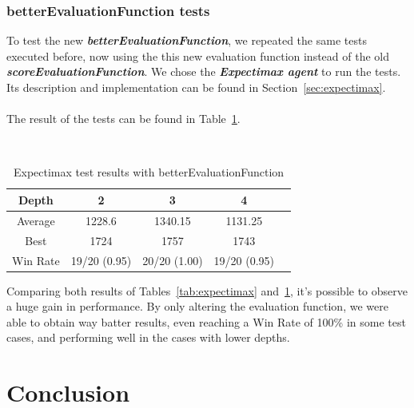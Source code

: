 \documentclass{article}
\begin{document}
\subsubsection{betterEvaluationFunction tests}

To test the new \textit\textbf{{betterEvaluationFunction}}, we repeated the same tests executed before, now using the this new evaluation function instead of the old \textit\textbf{{scoreEvaluationFunction}}. We chose the  \textit\textbf{{Expectimax agent}} to run the tests. Its description and implementation can be found in Section~\ref{sec:expectimax}.
~\\
~\\
The result of the tests can be found in Table~\ref{tab:expectimax-better}.

~\\
\begin{table}[!ht]
  \begin{center}
    \begin{tabular}{||c||c|c|c|c||}
      \hline
      Depth & 2 & 3 & 4 \\
      \hline\hline
      Average &  1228.6 &  1340.15 &  1131.25 \\
      \hline\hline
      Best & 1724 & 1757 & 1743 \\
      \hline\hline
      Win Rate & 19/20 (0.95) & 20/20 (1.00) & 19/20 (0.95) \\
      \hline
    \end{tabular}
    \caption{Expectimax test results with betterEvaluationFunction}
    \label{tab:expectimax-better}
  \end{center}
\end{table}

Comparing both results of Tables~\ref{tab:expectimax} and~\ref{tab:expectimax-better}, it's possible to observe a huge gain in performance. By only altering the evaluation function, we were able to obtain way batter results, even reaching a Win Rate of 100\% in some test cases, and performing well in the cases with lower depths.

\pagebreak
\section{Conclusion}
\end{document}
